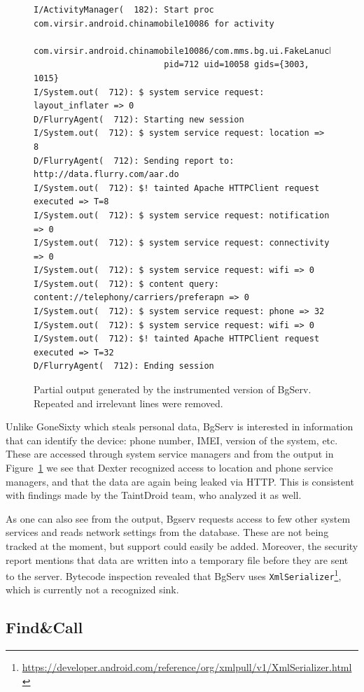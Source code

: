 \documentclass[12pt,twoside,notitlepage]{report}
\newcommand{\weblink}[1] {\footnote{\scriptsize\url{#1}}}
\begin{document}
\begin{figure}[t]
	\scriptsize
	\begin{verbatim}
I/ActivityManager(  182): Start proc com.virsir.android.chinamobile10086 for activity 
                          com.virsir.android.chinamobile10086/com.mms.bg.ui.FakeLanucherActivity: 
                          pid=712 uid=10058 gids={3003, 1015}
I/System.out(  712): $ system service request: layout_inflater => 0
D/FlurryAgent(  712): Starting new session
I/System.out(  712): $ system service request: location => 8
D/FlurryAgent(  712): Sending report to: http://data.flurry.com/aar.do
I/System.out(  712): $! tainted Apache HTTPClient request executed => T=8
I/System.out(  712): $ system service request: notification => 0
I/System.out(  712): $ system service request: connectivity => 0
I/System.out(  712): $ system service request: wifi => 0
I/System.out(  712): $ content query: content://telephony/carriers/preferapn => 0
I/System.out(  712): $ system service request: phone => 32
I/System.out(  712): $ system service request: wifi => 0
I/System.out(  712): $! tainted Apache HTTPClient request executed => T=32
D/FlurryAgent(  712): Ending session
	\end{verbatim}
	\caption{Partial output generated by the instrumented version of BgServ. Repeated and irrelevant lines were removed.}
	\label{figure:Evaluation_BgServ}
\end{figure}

Unlike GoneSixty which steals personal data, BgServ is interested in information that can identify the device: phone number, IMEI, version of the system, etc. These are accessed through system service managers and from the output in Figure~\ref{figure:Evaluation_BgServ} we see that Dexter recognized access to location and phone service managers, and that the data are again being leaked via HTTP. This is consistent with findings made by the TaintDroid team, who analyzed it as well.

As one can also see from the output, Bgserv requests access to few other system services and reads network settings from the database. These are not being tracked at the moment, but support could easily be added. Moreover, the security report mentions that data are written into a temporary file before they are sent to the server. Bytecode inspection revealed that BgServ uses \verb$XmlSerializer$\weblink{https://developer.android.com/reference/org/xmlpull/v1/XmlSerializer.html}, which is currently not a recognized sink.

\subsection{Find\&Call}
\end{document}
